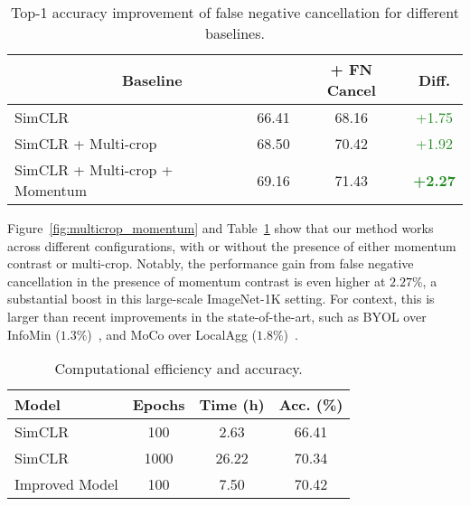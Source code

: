 \documentclass[10pt,twocolumn,letterpaper]{article}
\begin{document}
\begin{table}[h]
    {\footnotesize
    \centering
    \setlength{\tabcolsep}{2pt}
    \begin{tabularx}{\linewidth}{Xccc}
    \toprule
    \multicolumn{2}{c}{Baseline} & + FN Cancel & Diff.\\
    \midrule
    SimCLR & 66.41 & 68.16 & \textcolor{ForestGreen}{+1.75} \\
    SimCLR + Multi-crop & 68.50 & 70.42 & \textcolor{ForestGreen}{+1.92} \\
    SimCLR + Multi-crop + Momentum & 69.16 & 71.43 & \textbf{\textcolor{ForestGreen}{+2.27}} \\
    \bottomrule
    \end{tabularx}}
    \vspace{3pt}
    \caption{Top-1 accuracy improvement of false negative cancellation for different baselines.}\label{tab:fn_improvement}
\end{table}
Figure~\ref{fig:multicrop_momentum} and Table~\ref{tab:fn_improvement} show that our method works across different configurations, with or without the presence of either momentum contrast or multi-crop. Notably, the performance gain from false negative cancellation in the presence of momentum contrast is even higher at $2.27\%$, a substantial boost in this large-scale ImageNet-1K setting. For context, this is larger than recent improvements in the state-of-the-art, such as BYOL over InfoMin ($1.3\%$)~\cite{grill2020bootstrap}, and MoCo over LocalAgg ($1.8\%$)~\cite{he2019moco}.




\begin{table}
    \footnotesize
    \centering
    \begin{tabularx}{\linewidth}{Xccc}
    \toprule
    Model & Epochs & Time (h) & Acc. (\%)\\
    \midrule
    SimCLR & \hphantom{0}100 & \hphantom{2}2.63 & 66.41 \\
    SimCLR & 1000 & 26.22 & 70.34 \\
Improved Model & \hphantom{0}100 & \hphantom{2}7.50 & 70.42 \\
    \bottomrule
    \end{tabularx}
    \vspace{3pt}
    \caption{Computational efficiency and accuracy.} \label{tab:efficiency_final}
    \vspace{-10pt}
\end{table}
\end{document}
